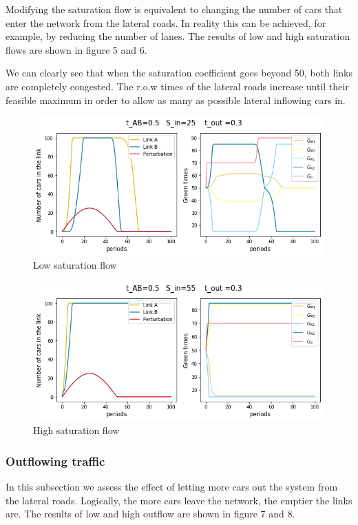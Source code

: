 \documentclass[11pt]{article}
\begin{document}
Modifying the saturation flow is equivalent to changing the number of cars that enter the network from the lateral roads. In reality this can be achieved, for example, by reducing the number of lanes. The results of low and high saturation flows are shown in figure 5 and 6.

We can clearly see that when the saturation coefficient goes beyond 50, both links are completely congested. The r.o.w times of the lateral roads increase until their feasible maximum in order to allow as many as possible lateral inflowing cars in.

\begin{figure}[h!]
    \caption{Low saturation flow}
      \centering
	\includegraphics[width=13cm]{sim2}
\end{figure}

\begin{figure}[h!]
    \caption{High saturation flow}
      \centering
	\includegraphics[width=13cm]{sim7}
\end{figure}

\subsubsection{Outflowing traffic}

In this subsection we assess the effect of letting more cars out the system from the lateral roads. Logically, the more cars leave the network, the emptier the links are. The results of low and high outflow are shown in figure 7 and 8.
\end{document}
